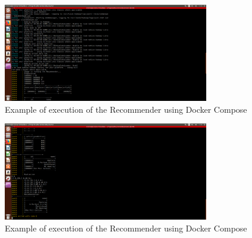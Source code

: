 \documentclass[11pt,a4paper,titlepage]{article}
\begin{document}
\newpage
\begin{figure}[ht]
    \centering
        \includegraphics[width=0.8\textwidth]{Screenshot(120).png}
        \caption{Example of execution of the Recommender using Docker Compose}
        \label{fig:execution1}
\end{figure}
\begin{figure}[ht]
    \centering
				\includegraphics[width=0.8\textwidth]{Screenshot(119).png}
		      \caption{Example of execution of the Recommender using Docker Compose}
		        \label{fig:execution2}
\end{figure}
\end{document}
